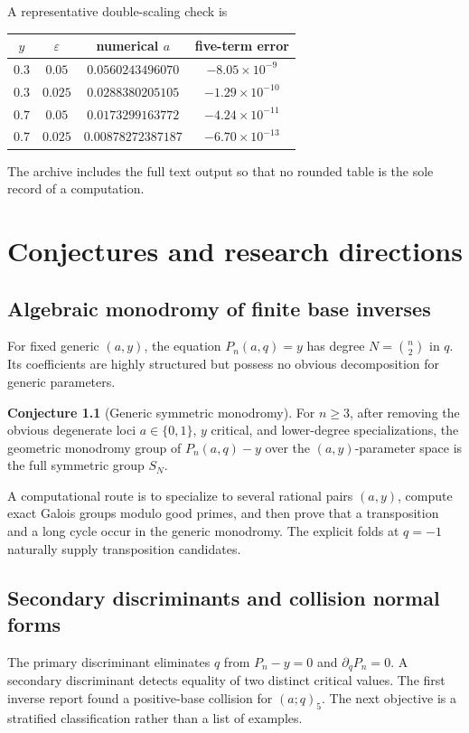 \documentclass[11pt,letterpaper,oneside,openany]{book}
\theoremstyle{definition}
\newtheorem{conjecture}{Conjecture}[chapter]
\theoremstyle{remark}
\begin{document}
A representative double-scaling check is
\begin{center}
\begin{tabular}{@{}cccc@{}}
\toprule
\(y\) & \(\varepsilon\) & numerical \(a\) & five-term error \\
\midrule
\(0.3\) & \(0.05\) & \(0.0560243496070\) & \(-8.05\times10^{-9}\) \\
\(0.3\) & \(0.025\) & \(0.0288380205105\) & \(-1.29\times10^{-10}\) \\
\(0.7\) & \(0.05\) & \(0.0173299163772\) & \(-4.24\times10^{-11}\) \\
\(0.7\) & \(0.025\) & \(0.00878272387187\) & \(-6.70\times10^{-13}\) \\
\bottomrule
\end{tabular}
\end{center}
The archive includes the full text output so that no rounded table is the sole
record of a computation.

\chapter{Conjectures and research directions}

\section{Algebraic monodromy of finite base inverses}
For fixed generic \((a,y)\), the equation
\(P_n(a,q)=y\) has degree \(N=\binom n2\) in \(q\).  Its coefficients are highly
structured but possess no obvious decomposition for generic parameters.

\begin{conjecture}[Generic symmetric monodromy]
For \(n\ge3\), after removing the obvious degenerate loci
\(a\in\{0,1\}\), \(y\) critical, and lower-degree specializations, the
geometric monodromy group of \(P_n(a,q)-y\) over the \((a,y)\)-parameter space
is the full symmetric group \(S_N\).
\end{conjecture}

A computational route is to specialize to several rational pairs \((a,y)\),
compute exact Galois groups modulo good primes, and then prove that a
transposition and a long cycle occur in the generic monodromy.  The explicit
folds at \(q=-1\) naturally supply transposition candidates.

\section{Secondary discriminants and collision normal forms}
The primary discriminant eliminates \(q\) from \(P_n-y=0\) and
\(\partial_qP_n=0\).  A secondary discriminant detects equality of two distinct
critical values.  The first inverse report found a positive-base collision for
\((a;q)_5\).  The next objective is a stratified classification rather than a
list of examples.
\end{document}
